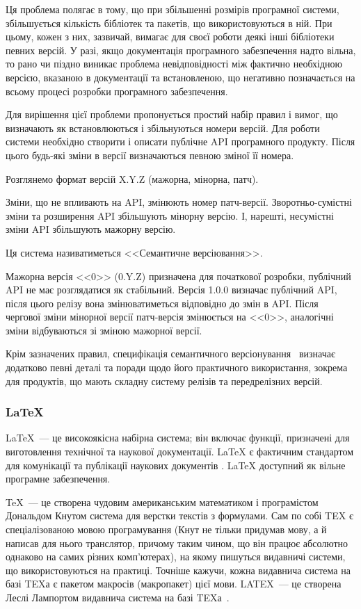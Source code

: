 Ця проблема полягає в тому, що при збільшенні розмірів програмної системи, збільшується кількість бібліотек та пакетів, що використовуються в ній. При цьому, кожен з них, зазвичай, вимагає для своєї роботи деякі інші бібліотеки певних версій. У разі, якщо документація програмного забезпечення надто вільна, то рано чи піздно виникає проблема невідповідності між фактично необхідною версією, вказаною в документації та встановленою, що негативно позначається на всьому процесі розробки програмного забезпечення.

Для вирішення цієї проблеми пропонується простий набір правил і вимог, що визначають як встановлюються і збільнуються номери версій. Для роботи системи необхідно створити і описати публічне API програмного продукту. Після цього будь-які зміни в версії визначаються певною зміної її номера.

Розглянемо формат версій X.Y.Z (мажорна, мінорна, патч).

Зміни, що не впливають на API, змінюють номер патч-версії. Зворотньо-сумістні зміни та розширення API збільшують мінорну версію. І, нарешті, несумістні зміни API збільшують мажорну версію.

Ця система називатиметься <<Семантичне версіювання>>.

Мажорна версія <<0>> (0.Y.Z) призначена для початкової розробки, публічний API не має розглядатися як стабільний. Версія 1.0.0 визначає публічний API, після цього релізу вона змінюватиметься відповідно до змін в API. Після чергової зміни мінорної версії патч-версія змінюється на <<0>>, аналогічні зміни відбуваються зі зміною мажорної версії.

Крім зазначених правил, специфікація семантичного версіонування~\cite{semver} визначає додатково певні деталі та поради щодо його практичного використання, зокрема для продуктів, що мають складну систему релізів та передрелізних версій.

\subsubsection{LaTeX} \label{subsub:latex}

\LaTeX~--- це високоякісна набірна система; він включає функції, призначені для виготовлення технічної та наукової документації. LaTeX є фактичним стандартом для комунікації та публікації наукових документів \cite{lamport1994latex}. LaTeX доступний як вільне програмне забезпечення.

\TeX~--- це створена чудовим американським математиком і програмістом Дональдом Кнутом система для верстки текстів з формулами. Сам по собі TEX є спеціалізованою мовою програмування (Кнут не тільки придумав мову, а й написав для нього транслятор, причому таким чином, що він працює абсолютно однаково на самих різних комп'ютерах), на якому пишуться видавничі системи, що використовуються на практиці. Точніше кажучи, кожна видавнича система на базі TEXа є пакетом макросів (макропакет) цієї мови. LATEX~--- це створена Леслі Лампортом видавнича система на базі TEXа~\cite{львовский2003latex}.

